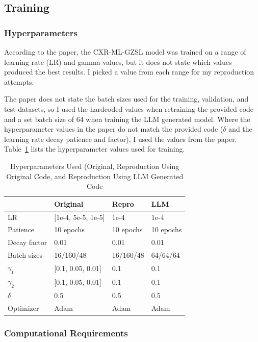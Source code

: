 \documentclass[letterpaper]{article} %
\begin{document}
\subsection{Training}

\subsubsection{Hyperparameters}

According to the paper, the CXR-ML-GZSL model was trained on a range of learning rate (LR) and gamma values, but it does not state which values produced the best results. I picked a value from each range for my reproduction attempts.

The paper does not state the batch sizes used for the training, validation, and test datasets, so I used the hardcoded values when retraining the provided code and a set batch size of 64 when training the LLM generated model. Where the hyperparameter values in the paper do not match the provided code ($\delta$ and the learning rate decay patience and factor), I used the values from the paper. Table~\ref{tab:hyperparameters} lists the hyperparameter values used for training.

\begin{table}[h!]
\centering
\begin{tabular}{|l|l|l|l|}
\hline
\textbf{} & \textbf{Original} & \textbf{Repro} & \textbf{LLM} \\
\hline
LR & [1e-4, 5e-5, 1e-5] & 1e-4 & 1e-4 \\
Patience & 10 epochs & 10 epochs & 10 epochs \\
Decay factor & 0.01 & 0.01 & 0.01 \\
Batch sizes & 16/160/48 & 16/160/48 & 64/64/64 \\
$\gamma_1$ & [0.1, 0.05, 0.01] & 0.1 & 0.1 \\
$\gamma_2$ & [0.1, 0.05, 0.01] & 0.1 & 0.1 \\
$\delta$ & 0.5 & 0.5 & 0.5 \\
Optimizer & Adam & Adam & Adam \\
\hline
\end{tabular}
\caption{Hyperparameters Used (Original, Reproduction Using Original Code, and Reproduction Using LLM Generated Code}
\label{tab:hyperparameters}
\end{table}

\subsubsection{Computational Requirements}
\end{document}
